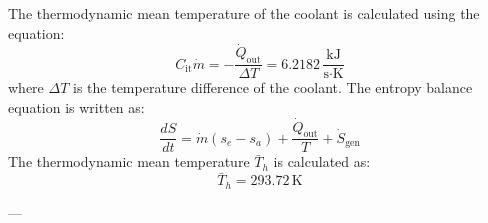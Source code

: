 The thermodynamic mean temperature of the coolant is calculated using the equation:  
\[
C_{\text{it}} \dot{m} = -\frac{\dot{Q}_{\text{out}}}{\Delta T} = 6.2182 \, \frac{\text{kJ}}{\text{s·K}}
\]  
where \( \Delta T \) is the temperature difference of the coolant.  
The entropy balance equation is written as:  
\[
\frac{dS}{dt} = \dot{m}(s_e - s_a) + \frac{\dot{Q}_{\text{out}}}{T} + \dot{S}_{\text{gen}}
\]  
The thermodynamic mean temperature \( \bar{T}_h \) is calculated as:  
\[
\bar{T}_h = 293.72 \, \text{K}
\]  

---